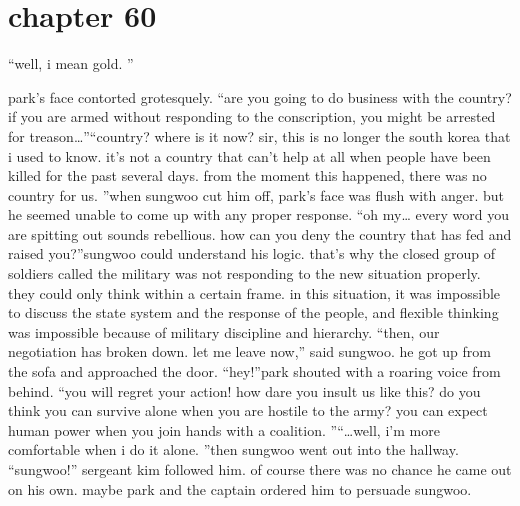 \section{chapter 60}

                            “well, i mean gold.
”




park’s face contorted grotesquely.
“are you going to do business with the country? if you are armed without responding to the conscription, you might be arrested for treason…”“country? where is it now? sir, this is no longer the south korea that i used to know.
 it’s not a country that can’t help at all when people have been killed for the past several days.
from the moment this happened, there was no country for us.
”when sungwoo cut him off, park’s face was flush with anger.
 but he seemed unable to come up with any proper response.
“oh my… every word you are spitting out sounds rebellious.
 how can you deny the country that has fed and raised you?”sungwoo could understand his logic.
 that’s why the closed group of soldiers called the military was not responding to the new situation properly.
 they could only think within a certain frame.
 in this situation, it was impossible to discuss the state system and the response of the people, and flexible thinking was impossible because of military discipline and hierarchy.
“then, our negotiation has broken down.
 let me leave now,” said sungwoo.
he got up from the sofa and approached the door.
“hey!”park shouted with a roaring voice from behind.
“you will regret your action! how dare you insult us like this? do you think you can survive alone when you are hostile to the army? you can expect human power when you join hands with a coalition.
”“…well, i’m more comfortable when i do it alone.
”then sungwoo went out into the hallway.
“sungwoo!” sergeant kim followed him.
of course there was no chance he came out on his own.
 maybe park and the captain ordered him to persuade sungwoo.

